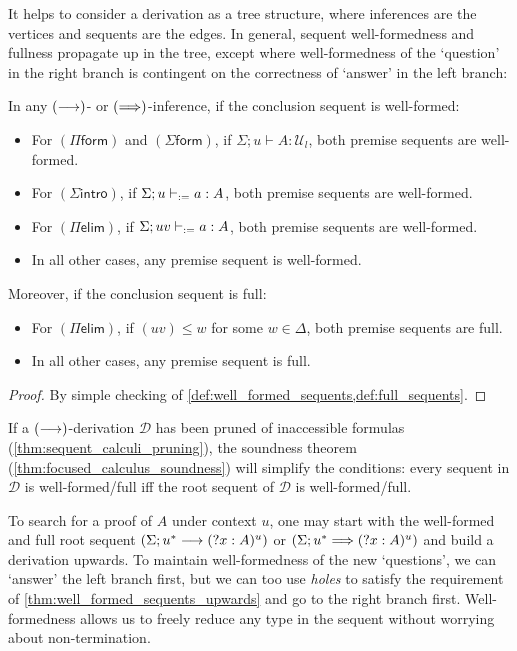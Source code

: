 \documentclass[twoside]{report}
\begin{document}
It helps to consider a derivation as a tree structure, where inferences are the vertices and sequents are the edges. In general, sequent well-formedness and fullness propagate up in the tree, except where well-formedness of the `question' in the right branch is contingent on the correctness of `answer' in the left branch:

\begin{proposition}
\label{thm:well_formed_sequents_upwards}
In any $(\longrightarrow)$- or $(\Longrightarrow)$-inference, if the conclusion sequent is well-formed:
\begin{itemize}[noitemsep]
    \item For $(\Pi\mathsf{form})$ and $(\Sigma\mathsf{form})$, if $\Sigma; u \vdash A : \mathcal U_l$, both premise sequents are well-formed.
    \item For $(\Sigma\mathsf{intro})$, if $\Sigma; u \vdash_{:=} a : A$, both premise sequents are well-formed.
    \item For $(\Pi\mathsf{elim})$, if $\Sigma; uv \vdash_{:=} a : A$, both premise sequents are well-formed.
    \item In all other cases, any premise sequent is well-formed.
\end{itemize}
Moreover, if the conclusion sequent is full:
\begin{itemize}[noitemsep]
    \item For $(\Pi\mathsf{elim})$, if $(uv) \leq w$ for some $w \in \Delta$, both premise sequents are full.
    \item In all other cases, any premise sequent is full.
\end{itemize}
\end{proposition}

\begin{proof}
By simple checking of \cref{def:well_formed_sequents,def:full_sequents}.
\end{proof}

If a $(\longrightarrow)$-derivation $\mathcal D$ has been pruned of inaccessible formulas (\cref{thm:sequent_calculi_pruning}), the soundness theorem (\cref{thm:focused_calculus_soundness}) will simplify the conditions: every sequent in $\mathcal D$ is well-formed/full iff the root sequent of $\mathcal D$ is well-formed/full.

To search for a proof of $A$ under context $u$, one may start with the well-formed and full root sequent $(\Sigma; u^\ast \longrightarrow ({?x} : A)^u)$ or $(\Sigma; u^\ast \Longrightarrow ({?x} : A)^u)$ and build a derivation upwards. To maintain well-formedness of the new `questions', we can `answer' the left branch first, but we can too use \emph{holes} to satisfy the requirement of \cref{thm:well_formed_sequents_upwards} and go to the right branch first. Well-formedness allows us to freely reduce any type in the sequent without worrying about non-termination.
\end{document}
